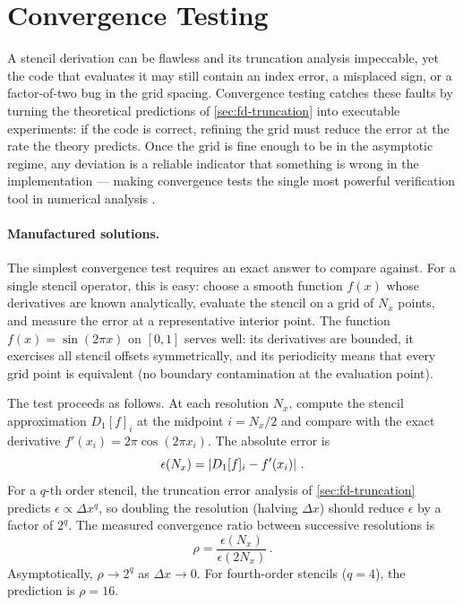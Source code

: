 \section{Convergence Testing}
\label{sec:fd-convergence}

A stencil derivation can be flawless and its truncation analysis
impeccable, yet the code that evaluates it may still contain an index
error, a misplaced sign, or a factor-of-two bug in the grid spacing.
Convergence testing catches these faults by turning the theoretical
predictions of \cref{sec:fd-truncation} into executable experiments: if
the code is correct, refining the grid must reduce the error at the rate
the theory predicts.  Once the grid is fine enough to be in the
asymptotic regime, any deviation is a reliable indicator that something
is wrong in the implementation --- making convergence tests the single
most powerful verification tool in numerical analysis \cite{Roache1998}.

\paragraph{Manufactured solutions.}

The simplest convergence test requires an exact answer to compare against.
For a single stencil operator, this is easy: choose a smooth function
$f(x)$ whose derivatives are known analytically, evaluate the stencil on
a grid of $N_x$ points, and measure the error at a representative
interior point.  The function $f(x) = \sin(2\pi x)$ on $[0, 1]$ serves
well: its derivatives are bounded, it exercises all stencil offsets
symmetrically, and its periodicity means that every grid point is
equivalent (no boundary contamination at the evaluation point).

The test proceeds as follows.  At each resolution $N_x$, compute the
stencil approximation $D_1[f]_i$ at the midpoint $i = N_x/2$ and compare
with the exact derivative $f'(x_i) = 2\pi\cos(2\pi x_i)$.  The absolute
error is
%
\begin{equation}
  \epsilon(N_x) = \left\lvert D_1[f]_i - f'(x_i) \right\rvert \,.
  \label{eq:manufactured-error}
\end{equation}
%
For a $q$-th order stencil, the truncation error analysis of
\cref{sec:fd-truncation} predicts $\epsilon \propto \Delta x^q$, so
doubling the resolution (halving $\Delta x$) should reduce $\epsilon$ by
a factor of $2^q$.  The measured convergence ratio between successive
resolutions is
%
\begin{equation}
  \rho = \frac{\epsilon(N_x)}{\epsilon(2 N_x)} \,.
  \label{eq:convergence-ratio-test}
\end{equation}
%
Asymptotically, $\rho \to 2^q$ as $\Delta x \to 0$.  For fourth-order
stencils ($q = 4$), the prediction is $\rho = 16$.

